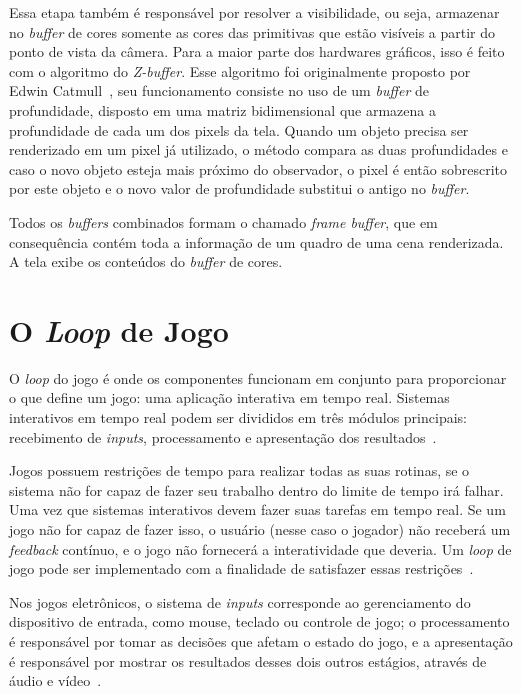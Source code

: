 Essa etapa também é responsável por resolver a visibilidade, ou seja, armazenar no 
\textit{buffer} de cores somente as cores das primitivas que estão visíveis a partir 
do ponto de vista da câmera. Para a maior parte dos hardwares gráficos, isso é feito com 
o algoritmo do \textit{Z-buffer}. Esse algoritmo foi originalmente proposto por Edwin 
Catmull~\cite{Catmull1974}, seu funcionamento consiste no uso de um \textit{buffer} de 
profundidade, disposto em uma matriz bidimensional que armazena a profundidade de cada 
um dos pixels da tela. Quando um objeto precisa ser renderizado em um pixel já 
utilizado, o método compara as duas profundidades e caso o novo objeto esteja mais 
próximo do observador, o pixel é então sobrescrito por este objeto e o novo valor de 
profundidade substitui o antigo no \textit{buffer}.

Todos os \textit{buffers} combinados formam o chamado \textit{frame buffer}, que em 
consequência contém toda a informação de um quadro de uma cena renderizada. A tela exibe 
os conteúdos do \textit{buffer} de cores.

\section{O \textit{Loop} de Jogo}
\label{gameloopsec}

O \textit{loop} do jogo é onde os componentes funcionam em conjunto para proporcionar o que 
define um jogo: uma aplicação interativa em tempo real. 
Sistemas interativos em tempo real podem ser divididos em três módulos principais: 
recebimento de \textit{inputs}, processamento e apresentação dos 
resultados~\cite{dalmau2004core}.

Jogos possuem restrições de tempo para realizar todas as 
suas rotinas, se o sistema não for capaz de fazer seu trabalho dentro do limite de 
tempo irá falhar. Uma vez que sistemas interativos devem fazer suas tarefas 
em tempo real. Se um jogo não for capaz de fazer isso, o usuário (nesse caso o 
jogador) não receberá um \textit{feedback} contínuo, e o jogo não fornecerá a 
interatividade que deveria. Um \textit{loop} de jogo pode ser implementado com a 
finalidade de satisfazer essas restrições~\cite{Joselli2010}.

Nos jogos eletrônicos, o sistema de \textit{inputs} corresponde ao gerenciamento do dispositivo 
de entrada, como mouse, teclado ou controle de jogo; o processamento é responsável 
por tomar as decisões que afetam o estado do jogo, e a apresentação é responsável por 
mostrar os resultados desses dois outros estágios, através de áudio e 
vídeo~\cite{valente2005real}. 

